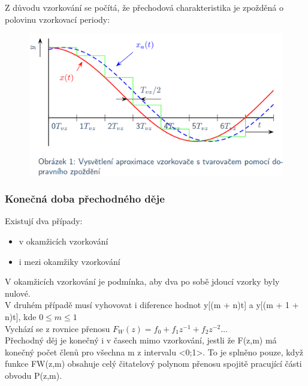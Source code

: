 Z důvodu vzorkování se počítá, že přechodová charakteristika je zpožděná o polovinu vzorkovací periody:
\begin{figure}[H]
    \centering
    \includegraphics*[scale = 0.27]{images/PSDVzorkovaniZpozdeni.png}
\end{figure}

\subsubsection*{Konečná doba přechodného děje}
Existují dva případy:
\begin{itemize}
    \item v okamžicích vzorkování
    \item i mezi okamžiky vzorkování
\end{itemize}
V okamžicích vzorkování je podmínka, aby dva po sobě jdoucí vzorky byly nulové.\\
V druhém případě musí vyhovovat i diference hodnot y[(m + n)t] a y[(m + 1 + n)t], kde $0 \leq m \leq 1$\\
Vychází se z rovnice přenosu $F_W(z) = f_0 + f_1z^{-1}+f_2z^{-2} \dots $ \\
Přechodný děj je konečný i v časech mimo vzorkování, jestli že F(z,m) má konečný počet členů pro všechna m z intervalu <0;1>. To je splněno pouze, když funkce FW(z,m) obsahuje celý čitatelový polynom přenosu spojitě pracující části obvodu P(z,m).\\
